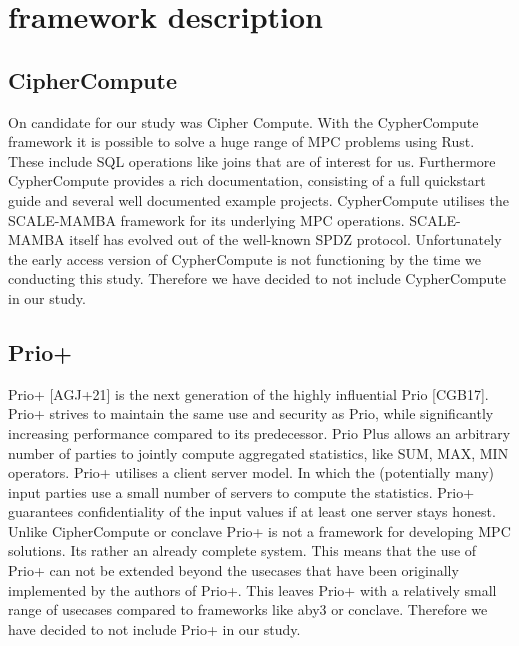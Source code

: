 \chapter{framework description}
\section{CipherCompute}
On candidate for our study was Cipher Compute. With the CypherCompute framework it is possible to solve a huge range of MPC problems using Rust. These include SQL operations like joins that are of interest for us. Furthermore CypherCompute provides a rich documentation, consisting of a full quickstart guide and several well documented example projects. CypherCompute utilises the SCALE-MAMBA framework for its underlying MPC operations. SCALE-MAMBA itself has evolved out of the well-known SPDZ protocol. Unfortunately the early access version of CypherCompute is not functioning by the time we conducting this study. Therefore we have decided to not include CypherCompute in our study.

\section{Prio+}
Prio+ [AGJ+21] is the next generation of the highly influential Prio [CGB17]. Prio+ strives to maintain the same use and security as Prio, while significantly increasing performance compared to its predecessor. Prio Plus allows an arbitrary number of parties to jointly compute aggregated statistics, like SUM, MAX, MIN operators. Prio+ utilises a client server model. In which the (potentially many) input parties use a small number of servers to compute the statistics.
Prio+ guarantees confidentiality of the input values if at least one server stays honest. Unlike CipherCompute or conclave Prio+ is not a framework for developing MPC solutions. Its rather an already complete system. This means that the use of Prio+ can not be extended beyond the usecases that have been originally implemented by the authors of Prio+. This leaves Prio+ with a relatively small range of usecases compared to frameworks like aby3 or conclave. Therefore we have decided to not include Prio+ in our study.

